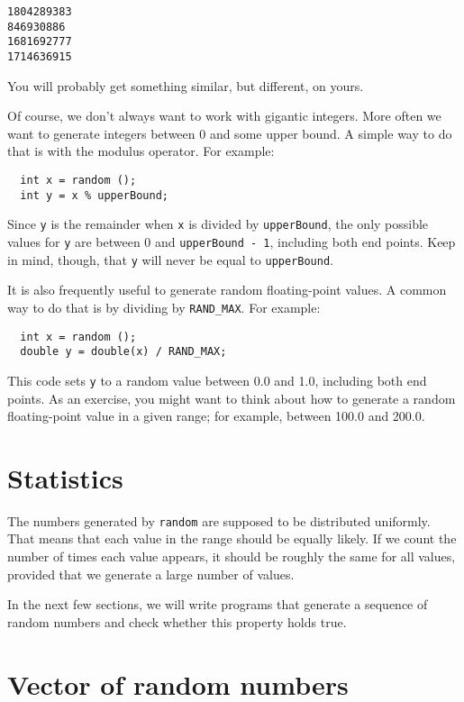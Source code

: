 \begin{verbatim}
1804289383
846930886
1681692777
1714636915
\end{verbatim}
%
You will probably get something similar, but different, on yours.

Of course, we don't always want to work with gigantic integers.
More often we want to generate integers between 0 and some
upper bound.  A simple way to do that is with the modulus
operator.  For example:

\begin{verbatim}
  int x = random ();
  int y = x % upperBound;
\end{verbatim}
%
Since {\tt y} is the remainder when {\tt x} is divided by
{\tt upperBound}, the only possible values for {\tt y}
are between 0 and {\tt upperBound - 1}, including both
end points.  Keep in mind, though, that {\tt y} will never
be equal to {\tt upperBound}.

It is also frequently useful to generate random floating-point values.
A common way to do that is by dividing by {\tt RAND\_MAX}.  For
example:

\begin{verbatim}
  int x = random ();
  double y = double(x) / RAND_MAX;
\end{verbatim}
%
This code sets {\tt y} to a random value between 0.0 and 1.0,
including both end points.  As an exercise, you might want to
think about how to generate a random floating-point value in
a given range; for example, between 100.0 and 200.0.

\section{Statistics}

The numbers generated by {\tt random} are supposed to be distributed
uniformly.  That means that each value in the range should be
equally likely.  If we count the number of times each value appears,
it should be roughly the same for all values, provided that we
generate a large number of values.

In the next few sections, we will write programs that generate
a sequence of random numbers and check whether this property
holds true.

\section{Vector of random numbers}


